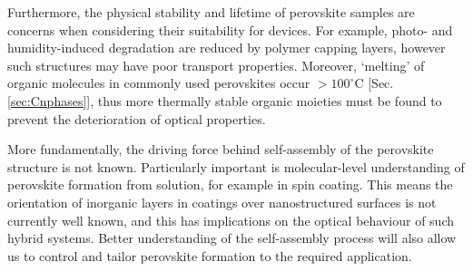 Furthermore, the physical stability and lifetime of perovskite samples are concerns when considering their suitability for devices. For example, photo- and humidity-induced degradation are reduced by polymer capping layers, however such structures may have poor transport properties. Moreover, `melting' of organic molecules in commonly used perovskites occur $>100^{\circ}$C [Sec.\,\ref{sec:Cnphases}], thus more thermally stable organic moieties must be found to prevent the deterioration of optical properties. 

More fundamentally, the driving force behind self-assembly of the perovskite structure is not known. Particularly important is molecular-level understanding of perovskite formation from solution, for example in spin coating. This means the orientation of inorganic layers in coatings over nanostructured surfaces is not currently well known, and this has implications on the optical behaviour of such hybrid systems. Better understanding of the self-assembly process will also allow us to control and tailor perovskite formation to the required application.